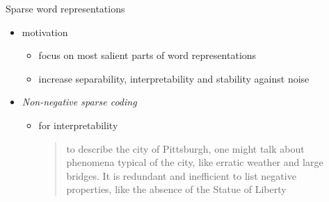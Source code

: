 \documentclass{beamer}
\newlength{\sepwid}
\newlength{\onecolwid}
\begin{document}
\begin{frame}[t]
  \begin{columns}[t] %

    \begin{column}{\sepwid} %
    \end{column}

    \begin{column}{\onecolwid} %

      \begin{block}{Sparse word representations}

        \begin{itemize}
          \item motivation
            \begin{itemize}
              \item focus on most salient parts of word representations \\
                \citep{Faruqui:2015,Berend:2017,Subramanian:2018}

              \item  increase separability, interpretability
                \citep{Olshausen:1997} and stability against noise
            \end{itemize}

          \item \emph{Non-negative sparse coding}
            \begin{itemize}
              \item for interpretability \\
                \citep{Faruqui:2015,Fyshe:2015,Arora:2016} 

                \begin{quotation}
                  to describe the city of Pittsburgh, one might talk about phenomena
                  typical of the city, like erratic weather and large bridges. It is
                  redundant and inefficient to list negative properties, like the
                  absence of the Statue of Liberty 
                    \begin{flushright} \citep{Subramanian:2018}\end{flushright}
                \end{quotation}


\end{itemize}
\end{itemize}
\end{block}
\end{column}
\end{columns}
\end{frame}
\end{document}

